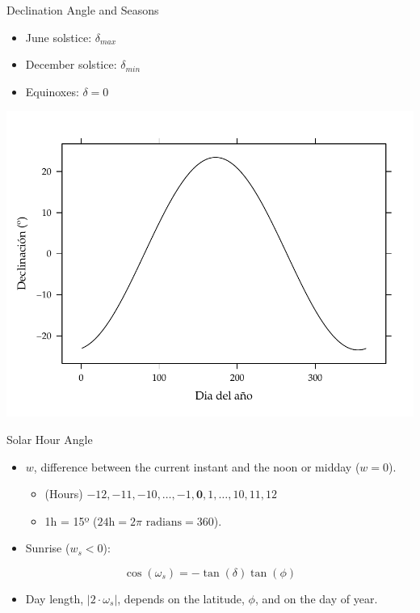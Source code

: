 \documentclass[xcolor={usenames,svgnames,dvipsnames}]{beamer}
\begin{document}
\begin{frame}[label={sec:org0be8bff}]{Declination Angle and Seasons}
\begin{itemize}
\item June solstice: \(\delta_{max}\)
\item December solstice: \(\delta_{min}\)
\item Equinoxes: \(\delta = 0\)
\end{itemize}

\begin{center}
\includegraphics[width=.9\linewidth]{../figs/Declinacion.pdf}
\end{center}
\end{frame}

\begin{frame}[label={sec:org30ce218}]{Solar Hour Angle}
\begin{itemize}
\item \(w\), difference between the current instant and the noon or midday (\(w = 0\)).
\begin{itemize}
\item (Hours) \(-12, -11, -10, \dots, -1, \textbf{0}, 1, \dots, 10, 11, 12\)
\item 1h = 15º (\(24\text{h} = 2\pi \text{ radians} = 360\)).
\end{itemize}

\item Sunrise (\(w_s < 0\)):
\end{itemize}
\[
\cos(\omega_{s}) = -\tan(\delta)\tan(\phi)
\]

\begin{itemize}
\item Day length, \(|2 \cdot \omega_s|\), depends on the \alert{latitude}, \(\phi\), and on the \alert{day of year}.
\end{itemize}
\end{frame}
\end{document}
